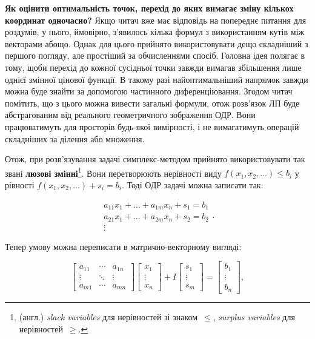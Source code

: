 \documentclass[\main/book.tex]{subfiles}
\begin{document}
\textbf{Як оцінити оптимальність точок, перехід до яких вимагає зміну кількох координат одночасно?} \quad Якщо читач вже має відповідь на попереднє питання для роздумів, у нього, ймовірно, з'явилось кілька формул з використанням кутів між векторами абощо. Однак для цього прийнято використовувати дещо складніший з першого погляду, але простіший за обчисленнями спосіб. Головна ідея полягає в тому, щоби перехід до кожної сусідньої точки завжди вимагав збільшення лише однієї змінної цінової функції. В такому разі найоптимальніший напрямок завжди можна буде знайти за допомогою частинного диференціювання. Згодом читач помітить, що з цього можна вивести загальні формули, отож розв'язок ЛП буде абстрагованим від реального геометричного зображення ОДР. Вони працюватимуть для просторів будь-якої вимірності, і не вимагатимуть операцій складніших за ділення або множення.
\noclub

Отож, при розв'язування задачі симплекс-методом прийнято використовувати так звані \textbf{люзові змінні}\footnote{(англ.) \textit{slack variables} для нерівностей зі знаком~\flqq{}$\leq$\frqq{}, \textit{surplus variables} для нерівностей~\flqq{}$\geq$\frqq{}.}. Вони перетворюють нерівності виду ${f(x_1, x_2, \ldots) \leq b_i}$ у рівності ${ f(x_1, x_2, \ldots) + s_i = b_i }$. Тоді ОДР задачі можна записати так:

\[
 \begin{array}{l}
  a_{11} x_1 + \ldots + a_{1m} x_n + s_1 = b_1 \\
  a_{21} x_1 + \ldots + a_{2m} x_n + s_2 = b_2 \\
  \vdots
 \end{array}.
\]

Тепер умову можна переписати в матрично-векторному вигляді:

$$
 \left[
 \begin{array}{ccc}
  a_{11} & \cdots & a_{1n} \\
  \vdots & \ddots & \vdots \\
  a_{m1} & \cdots & a_{mn}
 \end{array}
 \right]
 \left[
 \begin{array}{c}
  x_1 \\ \vdots \\ x_n
 \end{array}
 \right] +
 I \left[
 \begin{array}{c}
  s_1 \\ \vdots \\ s_m
 \end{array}
 \right] =
 \left[
 \begin{array}{c}
  b_1 \\ \vdots \\ b_n
 \end{array}
 \right],
$$
\end{document}
